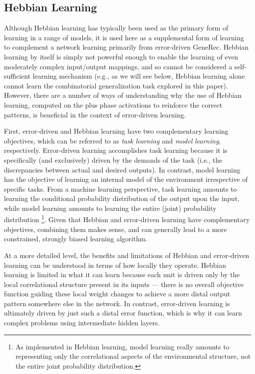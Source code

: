 \documentclass[12pt,twoside]{article}
\begin{document}
\subsection{Hebbian Learning}

Although Hebbian learning has typically been used as the primary form
of learning in a range of models, it is used here as a supplemental
form of learning to complement a network learning primarily from
error-driven GeneRec.  Hebbian learning by itself is simply not
powerful enough to enable the learning of even moderately complex
input/output mappings, and so cannot be considered a self-sufficient
learning mechanism (e.g., as we will see below, Hebbian learning alone
cannot learn the combinatorial generalization task explored in this
paper).  However, there are a number of ways of understanding why the
use of Hebbian learning, computed on the plus phase activations to
reinforce the correct patterns, is beneficial in the context of
error-driven learning.

First, error-driven and Hebbian learning have two complementary
learning objectives, which can be referred to as {\em task learning}
and {\em model learning}, respectively.  Error-driven learning
accomplishes task learning because it is specifically (and
exclusively) driven by the demands of the task (i.e., the
discrepancies between actual and desired outputs).  In contrast, model
learning has the objective of learning an internal model of the
environment irrespective of specific tasks.  From a machine learning
perspective, task learning amounts to learning the conditional
probability distribution of the output upon the input, while model
learning amounts to learning the entire (joint) probability
distribution \cite[e.g.,]{RubinsteinHastie97}\footnote{As implemented
  in Hebbian learning, model learning really amounts to representing
  only the correlational aspects of the environmental structure, not
  the entire joint probability distribution.}.  Given that Hebbian and
error-driven learning have complementary objectives, combining them
makes sense, and can generally lead to a more constrained, strongly
biased learning algorithm.

At a more detailed level, the benefits and limitations of Hebbian and
error-driven learning can be understood in terms of how locally they
operate.  Hebbian learning is limited in what it can learn because
each unit is driven only by the local correlational structure present
in its inputs --- there is no overall objective function guiding these
local weight changes to achieve a more distal output pattern somewhere
else in the network.  In contrast, error-driven learning is ultimately
driven by just such a distal error function, which is why it can learn
complex problems using intermediate hidden layers.
\end{document}

